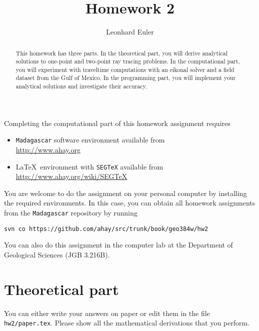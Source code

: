 \author{Leonhard Euler} 
\title{Homework 2}

\begin{abstract}
  This homework has three parts. In the theoretical part, you will
  derive analytical solutions to one-point and two-point ray tracing
  problems. In the computational part, you will experiment with
  traveltime computations with an eikonal solver and a field dataset
  from the Gulf of Mexico. In the programming part, you will implement
  your analytical solutions and investigate their accuracy.
\end{abstract}

Completing the computational part of this homework assignment requires
\begin{itemize}
\item \texttt{Madagascar} software environment available from \\
  \url{http://www.ahay.org}
\item \LaTeX\ environment with \texttt{SEGTeX} available from \\ 
  \url{http://www.ahay.org/wiki/SEGTeX}
\end{itemize}

You are welcome to do the assignment on your personal computer by
installing the required environments. In this case, you can obtain all
homework assignments from the \texttt{Madagascar} repository by running
\begin{verbatim}
svn co https://github.com/ahay/src/trunk/book/geo384w/hw2
\end{verbatim}


You can also do this assignment in the computer lab at the Department
of Geological Sciences (JGB 3.216B).

\section{Theoretical part}

You can either write your answers on paper or edit them in the file
\verb#hw2/paper.tex#. Please show all the mathematical
derivations that you perform.

